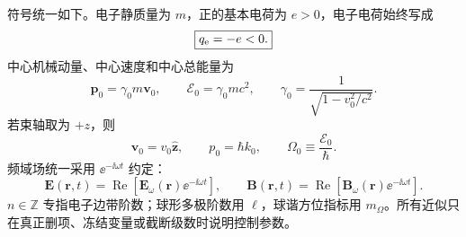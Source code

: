 符号统一如下。电子静质量为 \(m\)，正的基本电荷为 \(e>0\)，电子电荷始终写成
\begin{equation}
\boxed{q_{\rm e}=-e<0.}
\label{eq:electron-charge}
\end{equation}
中心机械动量、中心速度和中心总能量为
\begin{equation}
\bm p_0=\gamma_0m\bm v_0,
\qquad
\mathcal E_0=\gamma_0mc^2,
\qquad
\gamma_0=\frac{1}{\sqrt{1-v_0^2/c^2}}.
\label{eq:notation-rel}
\end{equation}
若束轴取为 \(+z\)，则
\begin{equation}
\bm v_0=v_0\hat{\bm z},
\qquad
p_0=\hbar k_0,
\qquad
\Omega_0\equiv\frac{\mathcal E_0}{\hbar}.
\label{eq:carrier-def}
\end{equation}
频域场统一采用 \(\ee^{-\ii\omega t}\) 约定：
\begin{equation}
\bm E(\bm r,t)=\operatorname{Re}\!\left[\bm E_\omega(\bm r)\ee^{-\ii\omega t}\right],
\qquad
\bm B(\bm r,t)=\operatorname{Re}\!\left[\bm B_\omega(\bm r)\ee^{-\ii\omega t}\right].
\label{eq:phasor-convention}
\end{equation}
\(n\in\mathbb Z\) 专指电子边带阶数；球形多极阶数用 \(\ell\)，球谐方位指标用 \(m_{\Omega}\)。所有近似只在真正删项、冻结变量或截断级数时说明控制参数。
